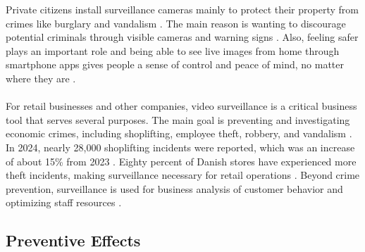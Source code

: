 Private citizens install surveillance cameras mainly to protect their property from crimes like burglary and vandalism \cite{bolius2024}. The main reason is wanting to discourage potential criminals through visible cameras and warning signs \cite{bolius2024}. Also, feeling safer plays an important role and being able to see live images from home through smartphone apps gives people a sense of control and peace of mind, no matter where they are \cite{bolius2024}.
\\\\
For retail businesses and other companies, video surveillance is a critical business tool that serves several purposes. The main goal is preventing and investigating economic crimes, including shoplifting, employee theft, robbery, and vandalism \cite{bolius2024}. In 2024, nearly 28,000 shoplifting incidents were reported, which was an increase of about 15\% from 2023 \cite{retailnews2025,danskerhverv2025rapport}. Eighty percent of Danish stores have experienced more theft incidents, making surveillance necessary for retail operations \cite{securityuser2025,danskerhverv2025rapport}. Beyond crime prevention, surveillance is used for business analysis of customer behavior and optimizing staff resources \cite{securitas2024butik}.

\subsection{Preventive Effects}
\label{subsec:preventive_effects}

